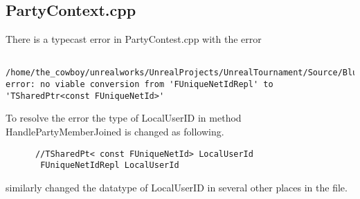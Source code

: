 \documentclass{article}
\begin{document}
    \subsection{PartyContext.cpp}
    There is a typecast error in PartyContest.cpp with the error
    \lstset{language=c++}
    \begin{lstlisting}
      /home/the_cowboy/unrealworks/UnrealProjects/UnrealTournament/Source/BlueprintContext/Private/PartyContext.cpp:147:35: error: no viable conversion from 'FUniqueNetIdRepl' to 'TSharedPtr<const FUniqueNetId>'
    \end{lstlisting}
    To resolve the error the type of LocalUserID in method HandlePartyMemberJoined is changed as following.
    \begin{lstlisting}
      //TSharedPt< const FUniqueNetId> LocalUserId
       FUniqueNetIdRepl LocalUserId
     \end{lstlisting}
     similarly changed the datatype of LocalUserID in several other places in the file.
\end{document}
